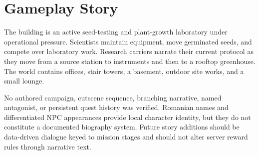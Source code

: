 \section{Gameplay Story}
The building is an active seed-testing and plant-growth laboratory under operational pressure.\allowbreak{} Scientists maintain equipment, move germinated seeds, and compete over laboratory work.\allowbreak{} Research carriers narrate their current protocol as they move from a source station to instruments and then to a rooftop greenhouse.\allowbreak{} The world contains offices, stair towers, a basement, outdoor site works, and a small lounge.\allowbreak{}

No authored campaign, cutscene sequence, branching narrative, named antagonist, or persistent quest history was verified.\allowbreak{} Romanian names and differentiated NPC appearances provide local character identity, but they do not constitute a documented biography system.\allowbreak{} Future story additions should be data-driven dialogue keyed to mission stages and should not alter server reward rules through narrative text.\allowbreak{}

